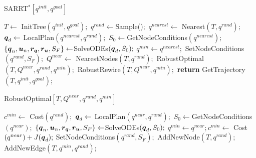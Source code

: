\begin{algorithm}[t]
    \caption{SARRT$^* [q^{init}, q^{goal}]$}\label{alg:SARRT*}
    \begin{algorithmic}[1]
        \State $T \gets$ InitTree$({q^{init}, q^{goal}});$
            \State $q^{rand} \gets $Sample()$;$
            \State $q^{nearest} \gets$ Nearest$(T,{q^{rand}});$
            \State $\boldsymbol{q}_d \gets$ LocalPlan$({q^{nearest}},{q^{rand}});$
            \State $S_0 \gets $GetNodeConditions$({q^{nearest}});$
            \State $\left \{\boldsymbol{q}_n, \boldsymbol{u}_n, \boldsymbol{r_q}, \boldsymbol{r_u}, S_F \right \}  \gets $SolveODEs$(\boldsymbol{q}_d, S_0);$
                \State $q^{min} \gets q^{nearest};$
                \State SetNodeConditions$({q^{rand}}, S_{F});$
                \State $Q^{near} \gets$ NearestNodes$(T,{q^{rand}});$
                \State RobustOptimal$(T, Q^{near}, q^{rand}, q^{min});$
                \State RobustRewire$(T, Q^{near}, q^{min});$
            \EndIf
        \EndWhile
        \State \textbf{return} GetTrajectory$(T, q^{init}, q^{goal})$;
    \end{algorithmic}
\end{algorithm}

\begin{algorithm}[t]
    \caption{RobustOptimal$[T, Q^{near}, q^{rand}, q^{min}]$}\label{alg:RobustOptimalConnect}
    \begin{algorithmic}[1]
        \State $c^{min} \gets$ Cost$(q^{rand});$
            \State $\boldsymbol{q}_d \gets$ LocalPlan$(q^{near},q^{rand});$
            \State $S_0 \gets $GetNodeConditions$({q^{near}});$
            \State $\left \{\boldsymbol{q}_n, \boldsymbol{u}_n, \boldsymbol{r_q}, \boldsymbol{r_u}, S_F \right \}  \gets $SolveODEs$(\boldsymbol{q}_d, S_0);$
                    \State $q^{min} \gets q^{near}; c^{min} \gets$ Cost$(q^{near}) + J(\boldsymbol{q}_d);$
                    \State SetNodeConditions$({q^{rand}}, S_{F});$
                \EndIf
            \EndIf
        \EndFor
        \State AddNewNode$(T, {q^{rand}});$
        \State AddNewEdge$(T, {q^{min}}, {q^{rand}});$
    \end{algorithmic}
\end{algorithm}

